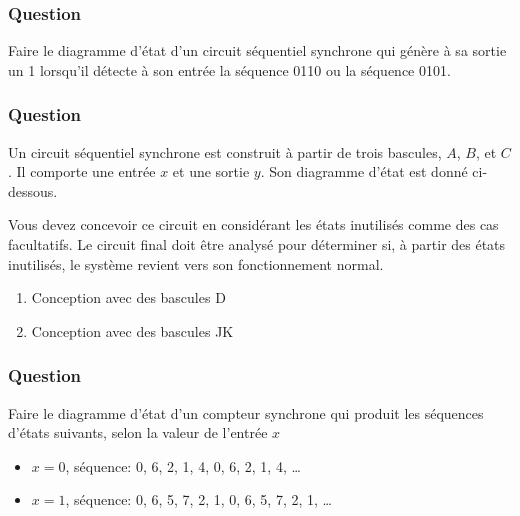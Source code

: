 \documentclass[11pt]{article}
\begin{document}
\subsubsection*{Question}
\label{sec:org19a3e70}
Faire le diagramme d'état d'un circuit séquentiel synchrone qui génère
à sa sortie un 1 lorsqu'il détecte à son entrée la séquence 0110 ou la
séquence 0101.

\subsubsection*{Question}
\label{sec:org4e09812}
Un circuit séquentiel synchrone est construit à partir de trois
   bascules, \(A\), \(B\), et \(C\). Il comporte une entrée \(x\) et
   une sortie \(y\). Son diagramme d'état est donné ci-dessous. 
\begin{center}

\end{center}

Vous devez concevoir ce circuit en considérant les états inutilisés
comme des cas facultatifs. Le circuit final doit être analysé pour
déterminer si, à partir des états inutilisés, le système revient vers
son fonctionnement normal.
\begin{enumerate}
\item Conception avec des bascules D
\item Conception avec des bascules JK
\end{enumerate}

\subsubsection*{Question}
\label{sec:org4c5836b}
Faire le diagramme d'état d'un compteur synchrone qui produit les
  séquences d'états suivants, selon la valeur de l'entrée \(x\)

\begin{itemize}
\item \(x=0\), séquence: 0, 6, 2, 1, 4, 0, 6, 2, 1, 4, \dots{}
\item \(x=1\), séquence: 0, 6, 5, 7, 2, 1, 0, 6, 5, 7, 2, 1, \dots{}
\end{itemize}
\end{document}
